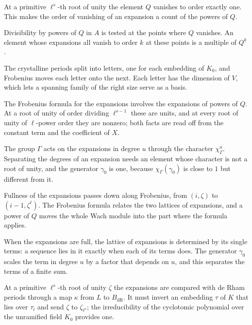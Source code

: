 At a primitive $\ell^s$-th root of unity the element $Q$ vanishes to order
exactly one. This makes the order of vanishing of an expansion a count of the
powers of $Q$.

Divisibility by powers of $Q$ in $A$ is tested at the points where $Q$
vanishes. An element whose expansions all vanish to order $k$ at these points
is a multiple of $Q^k$.

The crystalline periods split into letters, one for each embedding of $K_0$,
and Frobenius moves each letter onto the next. Each letter has the dimension of
$V$, which lets a spanning family of the right size serve as a basis.

The Frobenius formula for the expansions involves the expansions of powers of
$Q$. At a root of unity of order dividing $\ell^{s-1}$ these are units, and at
every root of unity of $\ell$-power order they are nonzero; both facts are read
off from the constant term and the coefficient of $X$.

The group $\Gamma$ acts on the expansions in degree $u$ through the character
$\chi_\Gamma^u$. Separating the degrees of an expansion needs an element whose
character is not a root of unity, and the generator $\gamma_0$ is one, because
$\chi_\Gamma(\gamma_0)$ is close to $1$ but different from it.

Fullness of the expansions passes down along Frobenius, from $(i,\zeta)$ to
$(i-1,\zeta^\ell)$. The Frobenius formula relates the two lattices of
expansions, and a power of $Q$ moves the whole Wach module into the part where
the formula applies.

When the expansions are full, the lattice of expansions is determined by its
single terms: a sequence lies in it exactly when each of its terms does. The
generator $\gamma_0$ scales the term in degree $u$ by a factor that depends on
$u$, and this separates the terms of a finite sum.

At a primitive $\ell^s$-th root of unity $\zeta$ the expansions are compared
with de Rham periods through a map $\kappa$ from $L$ to $B_{\mathrm{dR}}$. It
must invert an embedding $\tau$ of $K$ that lies over $\tau_i$ and send $\zeta$
to $\zeta_{\ell^s}$; the irreducibility of the cyclotomic polynomial over the
unramified field $K_0$ provides one.

